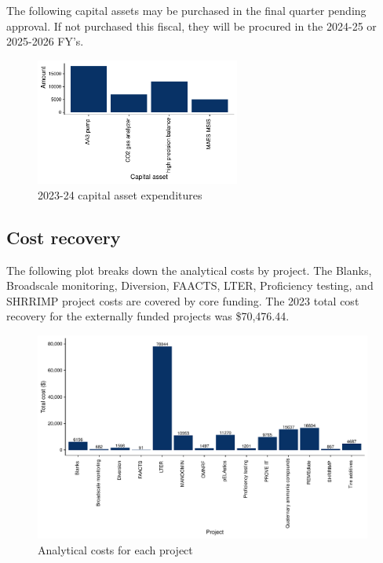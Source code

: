 \documentclass[
]{article}
\begin{document}
The following capital assets may be purchased in the final quarter
pending approval. If not purchased this fiscal, they will be procured in
the 2024-25 or 2025-2026 FY's.

\begin{figure}[h]
\centering
  \includegraphics[width=0.6\textwidth]{2023_24FY_capital_assets.pdf}
  \caption{2023-24 capital asset expenditures}
\end{figure}
\pagebreak

\hypertarget{cost-recovery}{%
\subsection{Cost recovery}\label{cost-recovery}}

The following plot breaks down the analytical costs by project. The
Blanks, Broadscale monitoring, Diversion, FAACTS, LTER, Proficiency
testing, and SHRRIMP project costs are covered by core funding. The 2023
total cost recovery for the externally funded projects was \$70,476.44.

\begin{figure}[h]
\centering
  \includegraphics[width=0.99\textwidth]{costs_summary_plot.pdf}
  \caption{Analytical costs for each project}
\end{figure}
\end{document}
